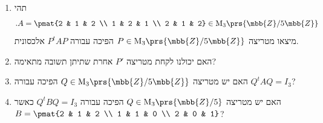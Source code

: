 \documentclass[a4paper,10pt,twoside,openany]{book}
\renewcommand{\Mat}{\mathrm{M}}
\begin{document}
\begin{exercisechap}
\begin{enumerate}
    \item תהי
\[\text{.} A = \pmat{2 & 1 & 2 \\ 1 & 2 & 1 \\ 2 & 1 & 2} \in \Mat_3\prs{\mbb{Z}/5\mbb{Z}}\]
מיצאו מטריצה
$P \in \Mat_3\prs{\mbb{Z}/5\mbb{Z}}$
הפיכה
עבורה
$P^t A P$
אלכסונית.

\item האם יכולנו לקחת מטריצה
$P'$
אחרת שתיתן תשובה מתאימה?

\item האם יש מטריצה
$Q \in \Mat_3\prs{\mbb{Z}/5\mbb{Z}}$
הפיכה עבורה
$Q^t A Q = I_3$?

\item האם יש מטריצה
$Q \in \Mat_3\prs{\mbb{Z}/5}$
הפיכה עבורה
$Q^t B Q = I_3$
כאשר
$B = \pmat{2 & 1 & 2 \\ 1 & 1 & 0 \\ 2 & 0 & 1}$?
\end{enumerate}
\end{exercisechap}
\end{document}
